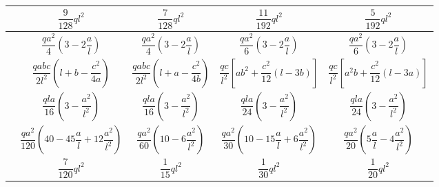 \begin{table}[H]
{\begin{tabular}{m{4cm}cccc}
         & $\dfrac{9}{128}ql^2$ & $\dfrac{7}{128}ql^2$ & $\dfrac{11}{192}ql^2$ & $\dfrac{5}{192}ql^2$ \\ \midrule
         & $\dfrac{qa^2}{4}\left(3-2\dfrac{a}{l}\right)$ & $\dfrac{qa^2}{4}\left(3-2\dfrac{a}{l}\right)$ & $\dfrac{qa^2}{6}\left(3-2\dfrac{a}{l}\right)$ & $\dfrac{qa^2}{6}\left(3-2\dfrac{a}{l}\right)$ \\ \midrule
         & $\dfrac{qabc}{2l^2}\left(l+b-\dfrac{c^2}{4a}\right)$ & $\dfrac{qabc}{2l^2}\left(l+a-\dfrac{c^2}{4b}\right)$ & $\dfrac{qc}{l^2}\left[ab^2+\dfrac{c^2}{12}\left(l-3b\right)\right]$ & $\dfrac{qc}{l^2}\left[a^2b+\dfrac{c^2}{12}\left(l-3a\right)\right]$ \\ \midrule
         & $\dfrac{qla}{16}\left(3-\dfrac{a^2}{l^2}\right)$ & $\dfrac{qla}{16}\left(3-\dfrac{a^2}{l^2}\right)$ & $\dfrac{qla}{24}\left(3-\dfrac{a^2}{l^2}\right)$ & $\dfrac{qla}{24}\left(3-\dfrac{a^2}{l^2}\right)$ \\ \midrule
         & $\dfrac{qa^2}{120}\left(40-45\dfrac{a}{l}+12\dfrac{a^2}{l^2}\right)$ & $\dfrac{qa^2}{60}\left(10-6\dfrac{a^2}{l^2}\right)$ & $\dfrac{qa^2}{30}\left(10-15\dfrac{a}{l}+6\dfrac{a^2}{l^2}\right)$ & $\dfrac{qa^2}{20}\left(5\dfrac{a}{l}-4\dfrac{a^2}{l^2}\right)$ \\ \midrule
         & $\dfrac{7}{120}ql^2$ & $\dfrac{1}{15}ql^2$ & $\dfrac{1}{30}ql^2$ & $\dfrac{1}{20}ql^2$ \\ \midrule
    \end{tabular}
	} %
    \label{tab:empotPerf}
\end{table}

